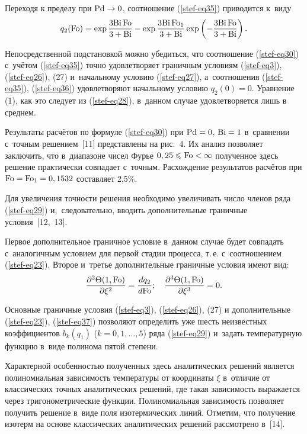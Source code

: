Переходя к пределу при ${\rm Pd}\to 0$, соотношение (\ref{stef-eq35}) приводится к~виду
\begin{equation}
\label{stef-eq36}
q_2 ({\rm Fo})=
\exp \frac{3{\rm Bi}\, {\rm Fo}}{3+{\rm Bi}}-
\exp \frac{3{\rm Bi}\,{\rm Fo}_1 }{3+{\rm Bi}}\exp \left( {-\frac{3{\rm Bi}\, {\rm Fo}}{3+{\rm Bi}}} \right).
\end{equation}

Непосредственной подстановкой можно убедиться, что соотношение (\ref{stef-eq30}) с~учётом 
(\ref{stef-eq35}) точно удовлетворяет граничным условиям (\ref{stef-eq3}), (\ref{stef-eq26}), (27) и~начальному 
условию (\ref{stef-eq27}), а~соотношения (\ref{stef-eq35}), (\ref{stef-eq36}) удовлетворяют начальному условию $q_2 
(0)=0$. Уравнение (1), как это следует из (\ref{stef-eq28}), в~данном случае 
удовлетворяется лишь в среднем.

Результаты расчётов по формуле (\ref{stef-eq30}) при ${\rm Pd}=0$, ${\rm Bi}=1$ в~сравнении с~точным 
решением~[11] представлены на рис.~4. Их анализ позволяет заключить, что в~диапазоне 
чисел Фурье $0,25\leqslant {\rm Fo}<\infty $ полученное здесь решение 
практически совпадает с~точным. Расхождение результатов расчётов при 
${\rm Fo}={\rm Fo}_1 =0,1532$ составляет 2,5{\%}.

Для увеличения точности решения необходимо увеличивать число членов ряда 
(\ref{stef-eq29}) и,~следовательно, вводить дополнительные граничные условия~\mbox{[12, 13].}

Первое дополнительное граничное условие в~данном случае будет совпадать с~аналогичным условием для первой стадии процесса, т.\,е. с~соотношением (\ref{stef-eq23}). 
Второе и~третье дополнительные граничные условия имеют вид:
\begin{equation}
\label{stef-eq37}
\frac{\partial ^2\Theta ( 1, {\rm Fo})}{\partial \xi ^2}=
\frac{dq_2 }{d{\rm Fo}};
\quad
\frac{\partial ^3\Theta (1, {\rm Fo})}{\partial \xi ^3}=0.
\end{equation}

Основные граничные условия (\ref{stef-eq3}), (\ref{stef-eq26}), (27) и дополнительные (\ref{stef-eq23}), (\ref{stef-eq37}) 
позволяют определить уже шесть неизвестных коэффициентов $b_k (q_1 )$ 
($k=0, 1, \dots, 5 $) ряда (\ref{stef-eq29}) и~задать температурную функцию в~виде 
полинома пятой степени.

Характерной особенностью полученных здесь аналитических решений является 
полиномиальная зависимость температуры от координаты $\xi $ в~отличие от 
классических точных аналитических решений, где такая зависимость выражается 
через тригонометрические функции. Полиномиальная зависимость позволяет 
получить решение в~виде поля изотермических линий. Отметим, что получение 
изотерм на основе классических аналитических решений рассмотрено в~[14]. 


